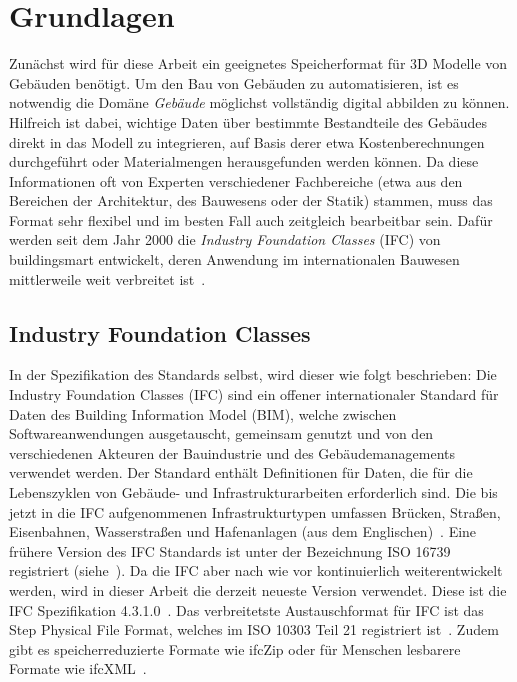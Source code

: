 
\chapter{Grundlagen}\label{basics}
Zunächst wird für diese Arbeit ein geeignetes Speicherformat für 3D Modelle von Gebäuden benötigt.
Um den Bau von Gebäuden zu automatisieren, ist es notwendig die Domäne \textit{Gebäude} möglichst vollständig digital abbilden zu können. 
Hilfreich ist dabei, wichtige Daten über bestimmte Bestandteile des Gebäudes direkt in das Modell zu integrieren, auf Basis derer etwa Kostenberechnungen durchgeführt oder Materialmengen herausgefunden werden können.
Da diese Informationen oft von Experten verschiedener Fachbereiche (etwa aus den Bereichen der Architektur, des Bauwesens oder der Statik) stammen, muss das Format sehr flexibel und im besten Fall auch zeitgleich bearbeitbar sein.
Dafür werden seit dem Jahr 2000 die \textit{Industry Foundation Classes} (IFC) von buildingsmart entwickelt, deren Anwendung im internationalen Bauwesen mittlerweile weit verbreitet ist~\cite{Industry61:online}.


\section{Industry Foundation Classes}\label{basics:ifc}
In der Spezifikation des Standards selbst, wird dieser wie folgt beschrieben:
\glqq{}Die Industry Foundation Classes (IFC) sind ein offener internationaler Standard für Daten des Building Information Model (BIM), welche zwischen Softwareanwendungen ausgetauscht, gemeinsam genutzt und von den verschiedenen Akteuren der Bauindustrie und des Gebäudemanagements verwendet werden. 
Der Standard enthält Definitionen für Daten, die für die Lebenszyklen von Gebäude- und Infrastrukturarbeiten erforderlich sind. 
Die bis jetzt in die IFC aufgenommenen Infrastrukturtypen umfassen Brücken, Straßen, Eisenbahnen, Wasserstraßen und Hafenanlagen\grqq{} (aus dem Englischen)~\cite{IFCScope:online}. 
Eine frühere Version des IFC Standards ist unter der Bezeichnung ISO 16739 registriert (siehe~\cite{ISOISO1694:online}).
Da die IFC aber nach wie vor kontinuierlich weiterentwickelt werden, wird in dieser Arbeit die derzeit neueste Version verwendet.
Diese ist die IFC Spezifikation 4.3.1.0~\cite{IFC4310Spezification:online}.
Das verbreitetste Austauschformat für IFC ist das Step Physical File Format, welches im ISO 10303 Teil 21 registriert ist~\cite{ISO_Step:online}.
Zudem gibt es speicherreduzierte Formate wie ifcZip oder für Menschen lesbarere Formate wie ifcXML~\cite{Industry93:online}\cite{IFCForma28:online}\cite{BIM_handbook_AEC_XML_SCHEMAS}.

